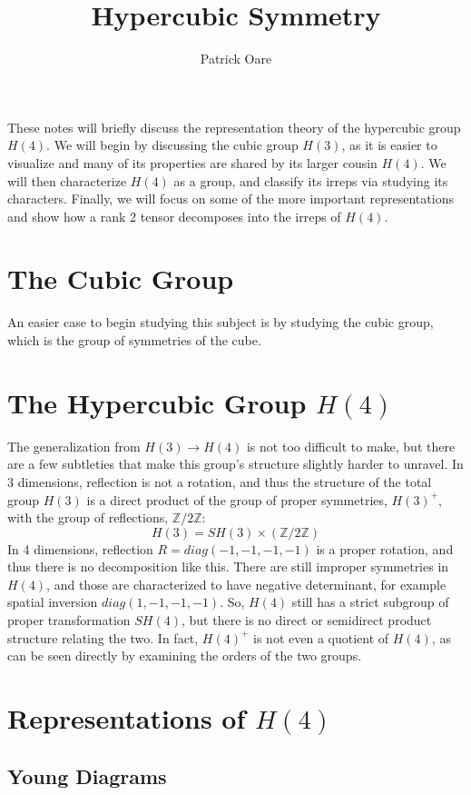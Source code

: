 \documentclass[11pt, oneside]{article}   	%
\title{Hypercubic Symmetry}
\author{Patrick Oare}
\date{}							%
\theoremstyle{definition}
\begin{document}
\maketitle

These notes will briefly discuss the representation theory of the hypercubic group $H(4)$. We will begin by discussing 
the cubic group $H(3)$, as it is easier to visualize and many of its properties are shared by its larger cousin $H(4)$. 
We will then characterize $H(4)$ as a group, and classify its irreps via studying its characters. Finally, we will focus on 
some of the more important representations and show how a rank 2 tensor decomposes into the irreps of $H(4)$. 

\section{The Cubic Group}

An easier case to begin studying this subject is by studying the cubic group, which is the group of symmetries of the cube. 


\section{The Hypercubic Group $H(4)$}

The generalization from $H(3)\rightarrow H(4)$ is not too difficult to make, but there are a few subtleties that make this 
group's structure slightly harder to unravel. In 3 dimensions, reflection is not a rotation, and thus the structure of the 
total group $H(3)$ is a direct product of the group of proper symmetries, $H(3)^+$, with the group of reflections, 
$\mathbb Z / 2\mathbb Z$:
\begin{equation}
	H(3) = SH(3)\times (\mathbb Z / 2\mathbb Z)
\end{equation}
In 4 dimensions, reflection $R = diag(-1, -1, -1, -1)$ is a proper rotation, and thus there is no decomposition like this. There 
are still improper symmetries in $H(4)$, and those are characterized to have negative determinant, for example spatial 
inversion $diag(1, -1, -1, -1)$. So, $H(4)$ still has a strict subgroup of proper transformation $SH(4)$, but there is 
no direct or semidirect product structure relating the two. In fact, $H(4)^+$ is not even a quotient of $H(4)$, as can 
be seen directly by examining the orders of the two groups. 



\section{Representations of $H(4)$}

\subsection{Young Diagrams}
\end{document}
